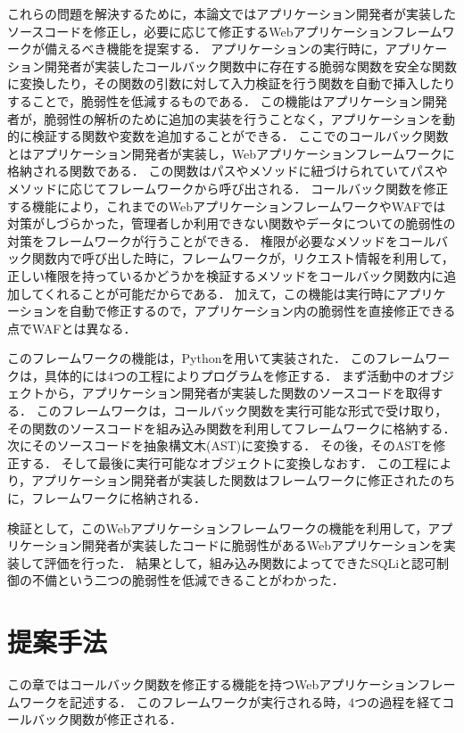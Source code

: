 \documentclass[twocolumn, 10pt, a4paper]{jsarticle}
\begin{document}
これらの問題を解決するために，本論文ではアプリケーション開発者が実装したソースコードを修正し，必要に応じて修正するWebアプリケーションフレームワークが備えるべき機能を提案する．
アプリケーションの実行時に，アプリケーション開発者が実装したコールバック関数中に存在する脆弱な関数を安全な関数に変換したり，その関数の引数に対して入力検証を行う関数を自動で挿入したりすることで，脆弱性を低減するものである．
この機能はアプリケーション開発者が，脆弱性の解析のために追加の実装を行うことなく，アプリケーションを動的に検証する関数や変数を追加することができる．
ここでのコールバック関数とはアプリケーション開発者が実装し，Webアプリケーションフレームワークに格納される関数である．
この関数はパスやメソッドに紐づけられていてパスやメソッドに応じてフレームワークから呼び出される．
コールバック関数を修正する機能により，これまでのWebアプリケーションフレームワークやWAFでは対策がしづらかった，管理者しか利用できない関数やデータについての脆弱性の対策をフレームワークが行うことができる．
権限が必要なメソッドをコールバック関数内で呼び出した時に，フレームワークが，リクエスト情報を利用して，正しい権限を持っているかどうかを検証するメソッドをコールバック関数内に追加してくれることが可能だからである．
加えて，この機能は実行時にアプリケーションを自動で修正するので，アプリケーション内の脆弱性を直接修正できる点でWAFとは異なる．

このフレームワークの機能は，Pythonを用いて実装された．
このフレームワークは，具体的には4つの工程によりプログラムを修正する．
まず活動中のオブジェクトから，アプリケーション開発者が実装した関数のソースコードを取得する．
このフレームワークは，コールバック関数を実行可能な形式で受け取り，その関数のソースコードを組み込み関数を利用してフレームワークに格納する．
次にそのソースコードを抽象構文木(AST)に変換する．
その後，そのASTを修正する．
そして最後に実行可能なオブジェクトに変換しなおす．
この工程により，アプリケーション開発者が実装した関数はフレームワークに修正されたのちに，フレームワークに格納される．

検証として，このWebアプリケーションフレームワークの機能を利用して，アプリケーション開発者が実装したコードに脆弱性があるWebアプリケーションを実装して評価を行った．
結果として，組み込み関数によってできたSQLiと認可制御の不備という二つの脆弱性を低減できることがわかった．

\section{提案手法}
この章ではコールバック関数を修正する機能を持つWebアプリケーションフレームワークを記述する．
このフレームワークが実行される時，4つの過程を経てコールバック関数が修正される．
\end{document}
